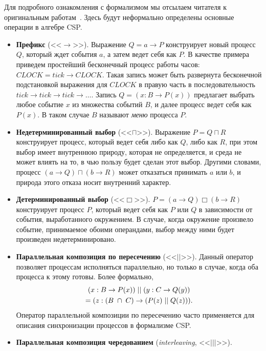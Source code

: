 \documentclass[conference]{IEEEtran}
\begin{document}
Для подробного ознакомления с формализмом мы отсылаем читателя к оригинальным 
работам~\cite{hoare1978communicating, brookes1984theory, hoare1985csp}. 
Здесь будут неформально определены основные операции в алгебре CSP.
\begin{itemize}
  \item \textbf{Префикс} (<<$\rightarrow$>>). Выражение $Q=a\rightarrow{P}$ конструирует 
    новый процесс $Q$, который ждет события $a$, а затем ведет себя как $P$. 
    В качестве примера приведем простейший бесконечный процесс работы часов: 
    $CLOCK=tick\rightarrow{CLOCK}$. Такая запись может быть развернута бесконечной 
    подстановкой выражения для $CLOCK$ в правую часть в последовательность 
    $tick\rightarrow{tick}\rightarrow{tick}\rightarrow\dots$. Запись 
    $Q=(x:B\rightarrow{P(x)})$ предлагает выбрать любое событие $x$ из множества 
    событий $B$, и далее процесс ведет себя как $P(x)$. В таком случае $B$ 
    называют \textit{меню} процесса $P$.
  \item \textbf{Недетерминированный выбор} (<<$\sqcap$>>). Выражение $P=Q\sqcap{R}$ 
    конструирует процесс, который ведет себя либо как $Q$, либо как $R$, при 
    этом выбор имеет внутреннюю природу, которая не определяется, и среда не 
     может влиять на то, в чью пользу будет сделан этот выбор. Другими словами, 
    процесс $(a\rightarrow{Q})\sqcap(b\rightarrow{R})$ может отказаться принимать $a$
    или $b$, и природа этого отказа носит внутренний характер.
  \item \textbf{Детерминированный выбор} (<<$\Box$>>). $P=(a\rightarrow{Q})\Box(b\rightarrow{R})$ 
    конструирует процесс $P$, который ведет себя как $P$ или $Q$ в зависимости 
    от события, выработанного окружением. В случае, когда окружение произвело 
    событие, принимаемое обоими операндами, выбор между ними будет произведен 
    недетерминировано.
  \item \textbf{Параллельная композиция по пересечению} (<<$||$>>). Данный оператор 
    позволяет процессам исполняться параллельно, но только в случае, когда оба 
    процесса к этому готовы. Более формально, 
    \begin{multline}
      $$(x:B\rightarrow{P}(x))\;||\;(y:C\rightarrow{Q}(y))\\
        =(z:(B\;\cap\;{C})\rightarrow(P(z)\;||\;Q(z))).$$
    \end{multline}
    Оператор параллельной композиции по пересечению часто применяется для 
    описания синхронизации процессов в формализме CSP. 
  \item \textbf{Параллельная композиция чередованием} (\textit{interleaving}, <<$|||$>>). 

\end{itemize}
\end{document}
